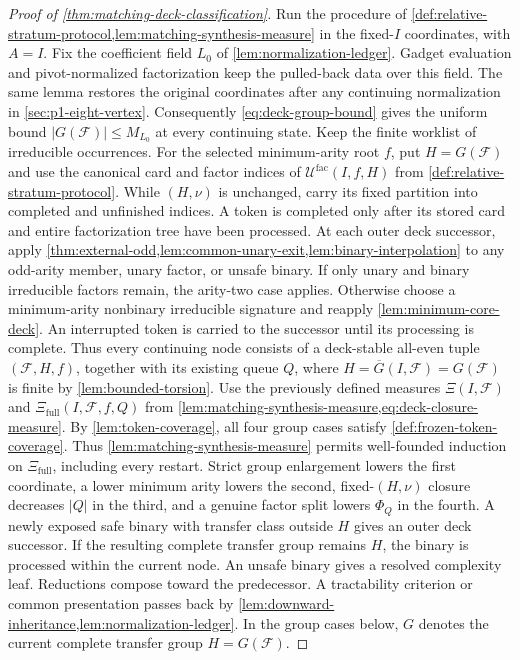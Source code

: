 \documentclass[11pt,letterpaper,onecolumn]{article}
\theoremstyle{plain}
\theoremstyle{definition}
\theoremstyle{remark}
\newcommand{\cF}{\mathcal F}
\begin{document}
\begin{proof}[Proof of \cref{thm:matching-deck-classification}]
Run the procedure of
\cref{def:relative-stratum-protocol,lem:matching-synthesis-measure}
in the fixed-\(I\) coordinates, with \(A=I\).
Fix the coefficient field \(L_0\) of \cref{lem:normalization-ledger}.
Gadget evaluation and pivot-normalized factorization keep the pulled-back
data over this field. The same lemma restores the original coordinates
after any continuing normalization in \cref{sec:p1-eight-vertex}.
Consequently \cref{eq:deck-group-bound} gives the uniform bound
\(|G(\cF)|\le M_{L_0}\) at every continuing state.
Keep the finite worklist of irreducible occurrences.
For the selected minimum-arity root \(f\), put \(H=G(\cF)\) and use the canonical card and
factor indices of \(\mathscr U^{\mathrm{fac}}(I,f,H)\) from
\cref{def:relative-stratum-protocol}. While \((H,\nu)\) is unchanged,
carry its fixed partition into completed and unfinished indices.
A token is completed only after its stored card and entire factorization
tree have been processed.  At each outer deck successor, apply
\cref{thm:external-odd,lem:common-unary-exit,lem:binary-interpolation}
to any odd-arity member, unary factor, or unsafe binary.
If only unary and binary irreducible factors remain, the arity-two case
applies. Otherwise choose a minimum-arity nonbinary irreducible signature
and reapply \cref{lem:minimum-core-deck}. An interrupted token
is carried to the successor until its processing is complete.  Thus every
continuing node consists of a deck-stable all-even tuple
\((\cF,H,f)\), together with its existing queue \(Q\), where
\(H=\overline G(I,\cF)=G(\cF)\) is finite by
\cref{lem:bounded-torsion}.  Use the previously defined measures
\(\Xi(I,\cF)\) and \(\Xi_{\mathrm{full}}(I,\cF,f,Q)\) from
\cref{lem:matching-synthesis-measure,eq:deck-closure-measure}.
By \cref{lem:token-coverage}, all four group cases satisfy
\cref{def:frozen-token-coverage}. Thus
\cref{lem:matching-synthesis-measure} permits well-founded induction on
\(\Xi_{\mathrm{full}}\), including every restart.
Strict group enlargement lowers the first coordinate, a lower minimum arity
lowers the second, fixed-\((H,\nu)\) closure decreases \(|Q|\) in the third, and a
genuine factor split lowers \(\Phi_Q\) in the fourth.  A newly exposed safe binary with transfer class outside \(H\)
gives an outer deck successor. If the resulting complete transfer group
remains \(H\), the binary is processed within the current node.
An unsafe binary gives a resolved complexity leaf.  Reductions compose toward the predecessor. A tractability criterion or
common presentation passes back by
\cref{lem:downward-inheritance,lem:normalization-ledger}.
In the group cases below, \(G\) denotes the current complete transfer
group \(H=G(\cF)\).


\end{proof}
\end{document}
